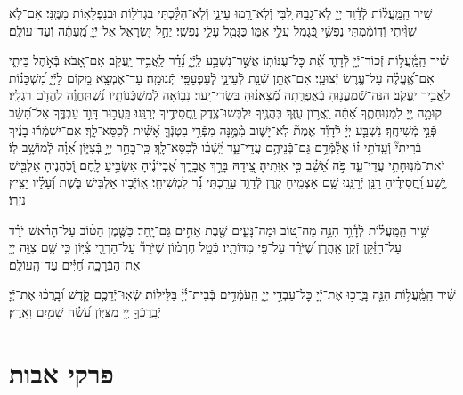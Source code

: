 \documentclass[twoside, openany, parskip=half, 11pt]{book}
\begin{document}
שִׁ֥יר הַֽמַּֽעֲל֗וֹת לְֿדָ֫וִ֥ד יְיָ֤ לֹֽא־גָבַ֣הּ לִ֭בִּי וְֿלֹֽא־רָ֣מוּ עֵינַ֑י וְֿלֹֽא־הִלַּ֓כְתִּי בִּגְדֹל֖וֹת וּבְנִפְלָא֣וֹת מִמֶּֽנִּי׃ אִם־לֹ֤א שִׁוִּ֨יתִי וְֿדֽוֹמַ֗מְתִּי נַפְשִׁ֥֗י כְּֿ֭גָמֻל עֲלֵ֣י אִמּ֑וֹ כַּגָּמֻ֖ל עָלַ֣י נַפְשִֽׁי׃ יַחֵ֣ל יִ֭שְׂרָאֵל אֶל־יְֿיָ֑ מֵֽ֝עַתָּ֗ה וְֿעַד־עוֹלָֽם׃

שִׁ֗יר הַֽמַּֽ֫עֲל֥וֹת זְֿכוֹר־יְֿיָ֥ לְֿדָוִ֑ד אֵ֝֗ת כׇּל־עֻנּוֹתֽוֹ׃ אֲשֶׁ֣ר־נִשְׁבַּ֥ע לַֽיְֿיָ֑ נָ֝דַ֗ר לַֽאֲבִ֥יר יַֽעֲקֹֽב׃ אִם־אָ֭בֹא בְּֿאֹ֣הֶל בֵּיתִ֑י אִם־אֶֽ֝עֱלֶ֗ה עַל־עֶ֥רֶשׂ יְֿצוּעָֽי׃ אִם־אֶתֵּ֣ן שְֿׁנָ֣ת לְֿעֵינָ֑י לְֽֿעַפְעַפַּ֥י תְּֿנוּמָֽה׃ עַד־אֶמְצָ֣א מָ֭קוֹם לַיְֿיָ֑ מִ֝שְׁכָּנ֗וֹת לַֽאֲבִ֥יר יַֽעֲקֹֽב׃ הִנֵּֽה־שְֿׁמַֽעֲנ֥וּהָ בְֿאֶפְרָ֑תָה מְֿ֝צָאנ֗וּהָ בִּשְׂדֵי־יָֽעַר׃ נָב֥וֹאָה לְֿמִשְׁכְּֿנוֹתָ֑יו נִֽ֝שְׁתַּֽחֲוֶ֗ה לַֽהֲדֹ֥ם רַגְלָֽיו׃ קוּמָ֣ה יְ֖יָ לִמְנֽוּחָתֶ֑ךָ אַ֝תָּ֗ה וַֽאֲר֥וֹן עֻזֶּֽךָ׃ כֹּֽהֲנֶ֥יךָ יִלְבְּֿשׁוּ־צֶ֑דֶק וַֽחֲסִידֶ֥יךָ יְֿרַנֵּֽנוּ׃ בַּֽעֲב֣וּר דָּוִ֣ד עַבְדֶּ֑ךָ אַל־תָּ֝שֵׁ֗ב פְּֿנֵ֣י מְֿשִׁיחֶֽךָ׃ נִשְׁבַּ֤ע יְיָ֨ לְֿדָוִ֡ד אֱמֶת֘ לֹֽא־יָשׁ֢וּב מִ֫מֶּ֥נָּה מִפְּֿרִ֥י בִטְנְֿךָ֑ אָ֝שִׁ֗ית לְֿכִסֵּא־לָֽךְ׃ אִם־יִשְׁמְֿר֬וּ בָנֶ֨יךָ בְּֿרִיתִי֘ וְֿעֵֽדֹתִ֥י ז֗וֹ אֲלַ֫מְּֿדֵ֥ם גַּם־בְּֿנֵיהֶ֥ם עֲדֵי־עַ֑ד יֵֽ֝שְֿׁב֗וּ לְֿכִסֵּא־לָֽךְ׃ כִּֽי־בָחַ֣ר יְיָ֣ בְּֿצִיּ֑וֹן אִ֝וָּ֗הּ לְֿמוֹשָׁ֥ב לֽוֹ׃ זֹֽאת־מְֿנֽוּחָתִ֥י עֲדֵי־עַ֑ד פֹּ֣ה אֵ֝שֵׁ֗ב כִּ֣י אִוִּתִֽיהָ׃ צֵ֭ידָהּ בָּרֵ֣ךְ אֲבָרֵ֑ךְ אֶ֝בְיוֹנֶ֗יהָ אַשְׂבִּ֥יעַ לָֽחֶם׃ וְֽֿ֭כֹֽהֲנֶיהָ אַלְבִּ֖ישׁ יֶ֑שַׁע וַֽ֝חֲסִידֶ֗יהָ רַנֵּ֥ן יְֿרַנֵּֽנוּ׃ שָׁ֤ם אַצְמִ֣יחַ קֶ֣רֶן לְֿדָוִ֑ד עָרַ֥כְתִּי נֵ֝֗ר לִמְשִׁיחִֽי׃ אֽ֭וֹיְֿבָיו אַלְבִּ֣ישׁ בֹּ֑שֶׁת וְֿ֝עָלָ֗יו יָצִ֥יץ נִזְרֽוֹ׃

שִׁ֥יר הַֽמַּֽעֲל֗וֹת לְֿדָ֫וִ֥ד הִנֵּ֣ה מַה־טּ֭וֹב וּמַה־נָּעִ֑ים שֶׁ֖בֶת אַחִ֣ים גַּם־יָֽחַד׃ כַּשֶּׁ֤מֶן הַטּ֨וֹב עַל־הָרֹ֗אשׁ יֹרֵ֗ד עַל־הַזָּ֫קָ֥ן זְֿקַ֥ן אַֽהֲרֹ֑ן שֶׁ֝יֹּרֵ֗ד עַל־פִּ֥י מִדּוֹתָֽיו׃ כְּֿטַ֥ל חֶרְמ֗וֹן שֶׁיֹּרֵד֘ עַל־הַרְרֵ֢י צִ֫יּ֥וֹן כִּ֤י שָׁ֤ם צִוָּ֣ה יְיָ֣ אֶת־הַבְּֿרָכָ֑ה חַ֝יִּ֗ים עַד־הָֽעוֹלָֽם׃

שִׁ֗יר הַֽמַּֽ֫עֲל֥וֹת הִנֵּ֤ה בָּֽרֲכ֣וּ אֶת־יְֿ֖יָ כׇּל־עַבְדֵ֣י יְיָ֑ הָֽעֹמְֿדִ֥ים בְּֿבֵית־יְֿ֜יָ֗ בַּלֵּילֽוֹת׃ שְֿׂאֽוּ־יְֿדֵכֶ֥ם קֹ֑דֶשׁ וּ֝בָֽרֲכ֗וּ אֶת־יְֿיָ׃ יְֿבָֽרֶכְֿךָ֣ יְ֖יָ מִצִּיּ֑וֹן עֹ֝שֵׂ֗ה שָׁמַ֥יִם וָאָֽרֶץ׃



\section[פרקי אבות]{ פרקי אבות }
\label{avos}

\newcommand{\kolyisroel}{
כָּל יִשְׂרָאֵל יֵשׁ לָהֶם חֵלֶק לְֿעוֹלָם הַבָּא, שֶׁנֶּאֱמַר וְֿעַמֵּךְ֙ \source{ישעשה ס}כֻּלָּ֣ם צַדִּיקִ֔ים לְֿעוֹלָ֖ם
יִ֣ירְֿשׁוּ אָ֑רֶץ נֵ֧צֶר מַטָּעַ֛י מַעֲשֵׂ֥ה יָדַ֖י לְֿהִתְפָּאֵֽר׃
}
\end{document}
